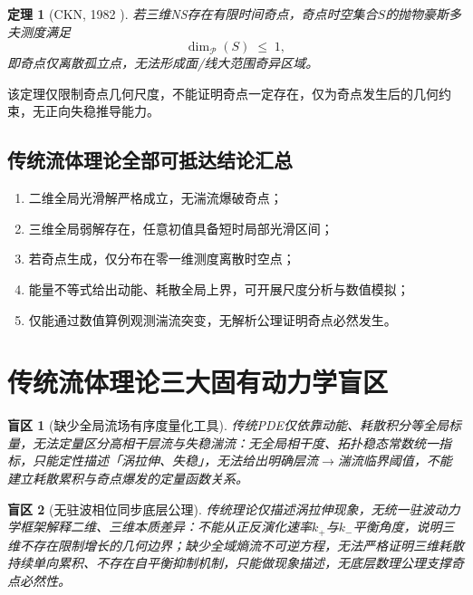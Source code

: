 \documentclass[11pt,a4paper]{ctexart}
\newtheorem{theorem}{定理}
\newtheorem{blindspot}{盲区}
\theoremstyle{remark}
\newcommand{\kplus}{k_{+}}
\newcommand{\kminus}{k_{-}}
\begin{document}
\begin{theorem}[CKN, 1982 {\citep{CKN1982}}]\label{thm:ckn}
若三维NS存在有限时间奇点，奇点时空集合$S$的抛物豪斯多夫测度满足
\begin{equation}\label{eq:ckn}
\dim_{\mathcal{P}}(S) \;\le\; 1,
\end{equation}
即奇点仅离散孤立点，无法形成面/线大范围奇异区域。
\end{theorem}

该定理仅限制奇点几何尺度，不能证明奇点一定存在，仅为奇点发生后的几何约束，无正向失稳推导能力。

\subsection{传统流体理论全部可抵达结论汇总}\label{sec:classical-summary}

\begin{enumerate}
    \item 二维全局光滑解严格成立，无湍流爆破奇点；
    \item 三维全局弱解存在，任意初值具备短时局部光滑区间；
    \item 若奇点生成，仅分布在零一维测度离散时空点；
    \item 能量不等式给出动能、耗散全局上界，可开展尺度分析与数值模拟；
    \item 仅能通过数值算例观测湍流突变，无解析公理证明奇点必然发生。
\end{enumerate}

\section{传统流体理论三大固有动力学盲区}\label{sec:blindspots}

\begin{blindspot}[缺少全局流场有序度量化工具]\label{bs:one}
传统PDE仅依靠动能、耗散积分等全局标量，无法定量区分高相干层流与失稳湍流：无全局相干度、拓扑稳态常数统一指标，只能定性描述「涡拉伸、失稳」，无法给出明确层流$\to$湍流临界阈值，不能建立耗散累积与奇点爆发的定量函数关系。
\end{blindspot}

\begin{blindspot}[无驻波相位同步底层公理]\label{bs:two}
传统理论仅描述涡拉伸现象，无统一驻波动力学框架解释二维、三维本质差异：不能从正反演化速率$\kplus$与$\kminus$平衡角度，说明三维不存在限制增长的几何边界；缺少全域熵流不可逆方程，无法严格证明三维耗散持续单向累积、不存在自平衡抑制机制，只能做现象描述，无底层数理公理支撑奇点必然性。
\end{blindspot}
\end{document}
